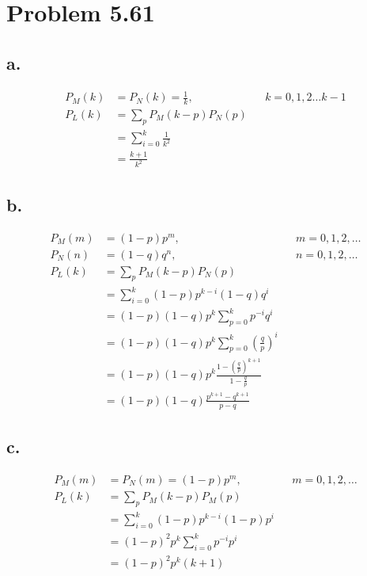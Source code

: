 \documentclass[12pt]{article}
\begin{document}
\section{Problem 5.61}
\subsection{a.}
\begin{align*}
  P_M(k) &= P_N(k) = \frac{1}{k}, & & k = 0,1,2 \dots k-1 \\
  P_L(k) &= \sum_p P_M(k-p)P_N(p) \\
  &= \sum_{i=0}^k \frac{1}{k^2} \\
  &= \frac{k+1}{k^2}
\end{align*}

\subsection{b.}
\begin{align*}
  P_M(m) &= (1-p)p^m, & &  m = 0,1,2,\dots \\
  P_N(n) &= (1-q)q^n, & &  n = 0,1,2,\dots \\
  P_L(k) &= \sum_p P_M(k-p)P_N(p) \\
  &= \sum_{i=0}^k (1-p)p^{k-i}(1-q)q^i \\
  &= (1-p)(1-q)p^k\sum_{p=0}^k p^{-i}q^i \\
  &= (1-p)(1-q)p^k\sum_{p=0}^k \left( \frac{q}{p} \right)^i \\
  &= (1-p)(1-q)p^k \frac{1-\left(\frac{q}{p}\right)^{k+1}}{1-\frac{q}{p}} \\
  &= (1-p)(1-q) \frac{p^{k+1}-q^{k+1}}{p-q}
\end{align*}

\subsection{c.}
\begin{align*}
  P_M(m) &= P_N(m) = (1-p)p^m, & &  m = 0,1,2,\dots \\
  P_L(k) &= \sum_p P_M(k-p)P_M(p) \\
  &= \sum_{i=0}^k (1-p)p^{k-i}(1-p)p^i \\
  &= (1-p)^2p^k\sum_{i=0}^k p^{-i}p^i \\
  &= (1-p)^2p^k(k+1)
\end{align*}
\end{document}
